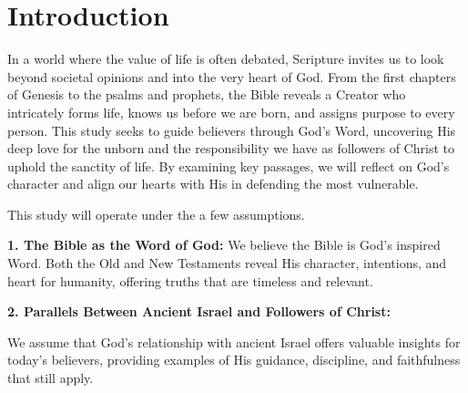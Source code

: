 \chapter{Introduction}
\begin{fullwidth}
In a world where the value of life is often debated, Scripture invites us to look beyond societal opinions and into the very heart of God. 
From the first chapters of Genesis to the psalms and prophets, the Bible reveals a Creator who intricately forms life, knows us before we are born, 
and assigns purpose to every person. This study seeks to guide believers through God's Word, uncovering His deep love for the unborn and the 
responsibility we have as followers of Christ to uphold the sanctity of life. By examining key passages, we will reflect on God's character 
and align our hearts with His in defending the most vulnerable.\\
\end{fullwidth}
\vspace{1\baselineskip}

This study will operate under the a few assumptions.
\vspace{1\baselineskip}

\textbf{1. The Bible as the Word of God:} 
We believe the Bible is God's inspired Word. Both the Old and New Testaments reveal His character, intentions, and heart for humanity, offering truths that are timeless and relevant.
\vspace{2\baselineskip}


\textbf{2. Parallels Between Ancient Israel and Followers of Christ:}

We assume that God's relationship with ancient Israel offers valuable insights for today's believers, providing examples of His guidance, discipline, and faithfulness that still apply.\\
\vspace{2\baselineskip}

